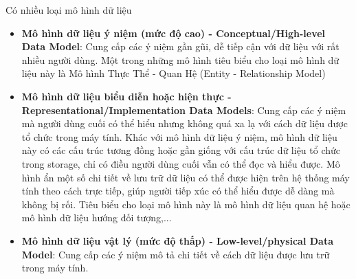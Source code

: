 \hspace*{0.5cm} Có nhiều loại mô hình dữ liệu
\begin{itemize}
	\item \textbf{Mô hình dữ liệu ý niệm (mức độ cao) - Conceptual/High-level Data Model}: Cung cấp các ý niệm gần gũi, dễ tiếp cận với dữ liệu với rất nhiều người dùng. Một trong những mô hình tiêu biểu cho loại mô hình dữ liệu này là Mô hình Thực Thể - Quan Hệ (Entity - Relationship Model)
	\item \textbf{Mô hình dữ liệu biểu diễn hoặc hiện thực - Representational/Implementation Data Models}:  Cung cấp các ý niệm mà người dùng cuối có thể hiểu nhưng không quá xa lạ với cách dữ liệu được tổ chức trong máy tính. Khác với mô hình dữ liệu ý niệm, mô hình dữ liệu này có các cấu trúc tương đồng hoặc gần giống với cấu trúc dữ liệu tổ chức trong storage, chỉ có điều người dùng cuối vẫn có thể đọc và hiểu được. Mô hình ẩn một số chi tiết về lưu trữ dữ liệu có thể được hiện trên hệ thống máy tính theo cách trực tiếp, giúp người tiếp xúc có thể hiểu được dễ dàng mà không bị rối. Tiêu biểu cho loại mô hình này là mô hình dữ liệu quan hệ hoặc mô hình dữ liệu hướng đối tượng,...
	\item \textbf{Mô hình dữ liệu vật lý (mức độ thấp) - Low-level/physical Data Model}: Cung cấp các ý niệm mô tả chi tiết về cách dữ liệu được lưu trữ
	trong máy tính.
\end{itemize}
